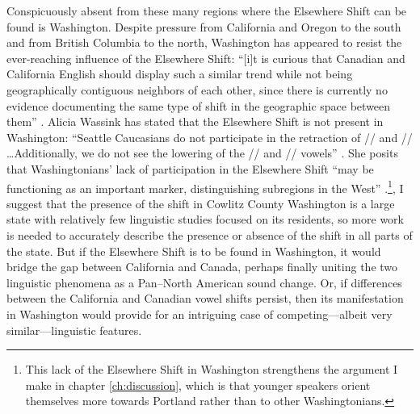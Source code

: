 Conspicuously absent from these many regions where the Elsewhere Shift can be found is Washington. Despite pressure from California and Oregon to the south and from British Columbia to the north, Washington has appeared to resist the ever-reaching influence of the Elsewhere Shift: ``[i]t is curious that Canadian and California English should display such a similar trend while not being geographically contiguous neighbors of each other, since there is currently no evidence documenting the same type of shift in the geographic space between them'' \citep[30--31]{swan_2016_diss}. Alicia Wassink has stated that the Elsewhere Shift is not present in Washington: ``Seattle Caucasians do not participate in the retraction of /\textipa{\ae}/ \bat and // \bet\ldots Additionally, we do not see the lowering of the // \bit and // \bet vowels'' \citeyearpar[84]{wassink_2016_pads}. She posits that Washingtonians' lack of participation in the Elsewhere Shift ``may be functioning as an important marker, distinguishing subregions in the West'' \citep[53]{wassink_2015}.\footnote{This lack of the Elsewhere Shift in Washington strengthens the argument I make in chapter \ref{ch:discussion}, which is that younger speakers orient themselves more towards Portland rather than to other Washingtonians.}, I suggest that the presence of the shift in Cowlitz County Washington is a large state with relatively few linguistic studies focused on its residents, so more work is needed to accurately describe the presence or absence of the shift in all parts of the state. But if the Elsewhere Shift is to be found in Washington, it would bridge the gap between California and Canada, perhaps finally uniting the two linguistic phenomena as a Pan--North American sound change. Or, if differences between the California and Canadian vowel shifts persist, then its manifestation in Washington would provide for an intriguing case of competing---albeit very similar---linguistic features.

